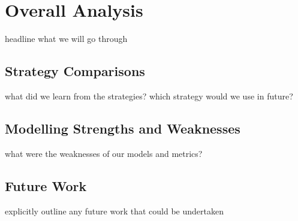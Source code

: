 \section{Overall Analysis}

\FIXME headline what we will go through

\subsection{Strategy Comparisons}

\FIXME what did we learn from the strategies? which strategy would we use in
future?

\subsection{Modelling Strengths and Weaknesses}

\FIXME what were the weaknesses of our models and metrics?

\subsection{Future Work}

\FIXME explicitly outline any future work that could be undertaken
